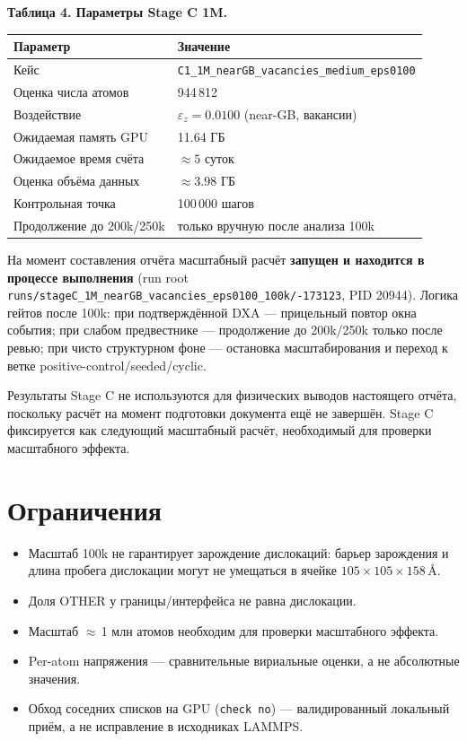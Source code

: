 \documentclass[14pt,a4paper]{extarticle}
\newcommand{\code}[1]{\texttt{#1}}
\newcommand{\tabcap}[1]{\par\smallskip\noindent\textbf{#1}\par\smallskip}
\begin{document}
\tabcap{Таблица 4. Параметры Stage C 1M.}
\begin{longtable}{p{} p{}}
\toprule
Параметр & Значение \\
\midrule
\endhead
Кейс & \code{C1\_1M\_nearGB\_\allowbreak vacancies\_medium\_eps0100} \\
Оценка числа атомов & 944\,812 \\
Воздействие & $\varepsilon_z = 0.0100$ (near-GB, вакансии) \\
Ожидаемая память GPU & 11.64 ГБ \\
Ожидаемое время счёта & $\approx 5$ суток \\
Оценка объёма данных & $\approx 3.98$ ГБ \\
Контрольная точка & 100\,000 шагов \\
Продолжение до 200k/250k & только вручную после анализа 100k \\
\bottomrule
\end{longtable}

На момент составления отчёта масштабный расчёт \textbf{запущен и находится в процессе выполнения} (run root \code{runs/stageC\_1M\_nearGB\_\allowbreak vacancies\_eps0100\_\allowbreak 100k/\allowbreak 20260616-173123}, PID 20944). Логика гейтов после 100k: при подтверждённой DXA — прицельный повтор окна события; при слабом предвестнике — продолжение до 200k/250k только после ревью; при чисто структурном фоне — остановка масштабирования и переход к ветке positive-control/seeded/cyclic.

Результаты Stage C не используются для физических выводов настоящего отчёта, поскольку расчёт на момент подготовки документа ещё не завершён. Stage C фиксируется как следующий масштабный расчёт, необходимый для проверки масштабного эффекта.

\section{Ограничения}
\begin{itemize}[leftmargin=1.6em,itemsep=1pt]
\item Масштаб 100k не гарантирует зарождение дислокаций: барьер зарождения и длина пробега дислокации могут не умещаться в ячейке $105\times105\times158$\,\AA.
\item Доля OTHER у границы/интерфейса не равна дислокации.
\item Масштаб $\approx$\,1 млн атомов необходим для проверки масштабного эффекта.
\item Per-atom напряжения — сравнительные вириальные оценки, а не абсолютные значения.
\item Обход соседних списков на GPU (\code{check no}) — валидированный локальный приём, а не исправление в исходниках LAMMPS.
\end{itemize}
\end{document}

